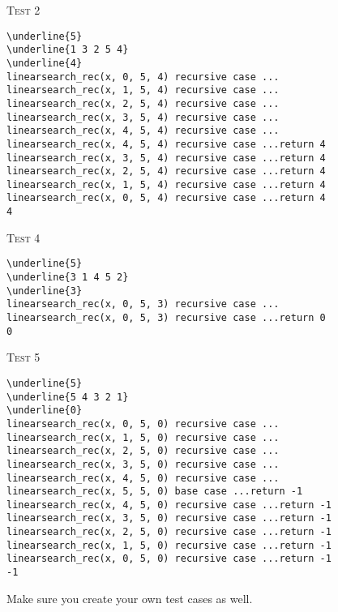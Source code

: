 \textsc{Test 2}
\begin{Verbatim}[commandchars=\\\{\}, fontsize=\small, frame=single]
\underline{5}
\underline{1 3 2 5 4}
\underline{4}
linearsearch_rec(x, 0, 5, 4) recursive case ...
linearsearch_rec(x, 1, 5, 4) recursive case ...
linearsearch_rec(x, 2, 5, 4) recursive case ...
linearsearch_rec(x, 3, 5, 4) recursive case ...
linearsearch_rec(x, 4, 5, 4) recursive case ...
linearsearch_rec(x, 4, 5, 4) recursive case ...return 4
linearsearch_rec(x, 3, 5, 4) recursive case ...return 4
linearsearch_rec(x, 2, 5, 4) recursive case ...return 4
linearsearch_rec(x, 1, 5, 4) recursive case ...return 4
linearsearch_rec(x, 0, 5, 4) recursive case ...return 4
4
\end{Verbatim}

\textsc{Test 4}
\begin{Verbatim}[commandchars=\\\{\}, fontsize=\small, frame=single]
\underline{5}
\underline{3 1 4 5 2}
\underline{3}
linearsearch_rec(x, 0, 5, 3) recursive case ...
linearsearch_rec(x, 0, 5, 3) recursive case ...return 0
0
\end{Verbatim}

\textsc{Test 5}
\begin{Verbatim}[commandchars=\\\{\}, fontsize=\small, frame=single]
\underline{5}
\underline{5 4 3 2 1}
\underline{0}
linearsearch_rec(x, 0, 5, 0) recursive case ...
linearsearch_rec(x, 1, 5, 0) recursive case ...
linearsearch_rec(x, 2, 5, 0) recursive case ...
linearsearch_rec(x, 3, 5, 0) recursive case ...
linearsearch_rec(x, 4, 5, 0) recursive case ...
linearsearch_rec(x, 5, 5, 0) base case ...return -1
linearsearch_rec(x, 4, 5, 0) recursive case ...return -1
linearsearch_rec(x, 3, 5, 0) recursive case ...return -1
linearsearch_rec(x, 2, 5, 0) recursive case ...return -1
linearsearch_rec(x, 1, 5, 0) recursive case ...return -1
linearsearch_rec(x, 0, 5, 0) recursive case ...return -1
-1
\end{Verbatim}

Make sure you create your own test cases as well.

